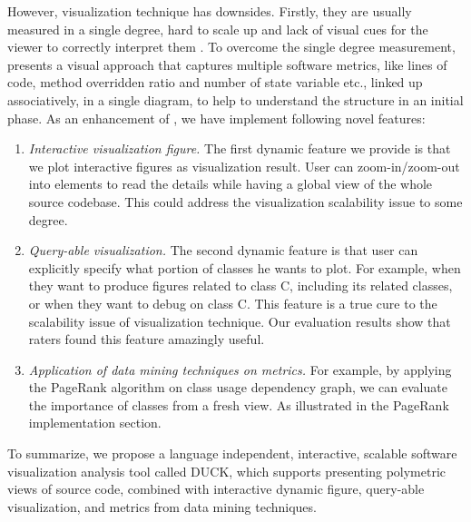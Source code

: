 \documentclass{sig-alternate}
\begin{document}
However, visualization technique has downsides.
Firstly, they are usually measured in a single degree,
hard to scale up and lack of visual cues for the viewer to correctly interpret them \cite{fenton2014software}.
To overcome the single degree measurement, \cite{lanza2003polymetric} presents a visual approach that captures multiple software metrics,
like lines of code, method overridden ratio and number of state variable etc.,
linked up associatively, in a single diagram,
to help to understand the structure in an initial phase.
As an enhancement of \cite{lanza2003polymetric}, we have implement following novel features:
\vspace{-2pt}
\begin{enumerate}
  \item \emph{Interactive visualization figure.} The first dynamic feature we provide is that we plot interactive figures as visualization result. User can zoom-in/zoom-out into elements to read the details while having a global view of the whole source codebase. This could address the visualization scalability issue to some degree. 
  \vspace{-6pt}
  \item \emph{Query-able visualization.} The second dynamic feature is that user can explicitly specify what portion of classes he wants to plot. For example, when they want to produce figures related to class C, including its related classes, or when they want to debug on class C. This feature is a true cure to the scalability issue of visualization technique. Our evaluation results show that raters found this feature amazingly useful.
  \vspace{-6pt}
  \item \emph{Application of data mining techniques on metrics.} For example, by applying the PageRank algorithm on class usage dependency graph, we can evaluate the importance of classes from a fresh view. As illustrated in the PageRank implementation section.
\end{enumerate}
\vspace{-2pt}
To summarize, we propose a language independent, interactive, scalable software visualization analysis tool called DUCK, which supports presenting polymetric views of source code, combined with interactive dynamic figure, query-able visualization, and metrics from data mining techniques.
\end{document}
